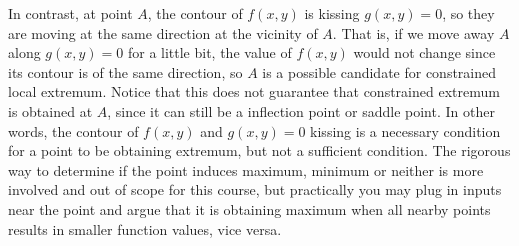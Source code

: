 In contrast, at point $A$, the contour of $f(x,y)$ is kissing $g(x,y) = 0$, so they are moving at the same direction at the vicinity of $A$.  That is, if we move away $A$ along $g(x,y)=0$ for a little bit, the value of $f(x,y)$ would not change since its contour is of the same direction, so $A$ is a possible candidate for constrained local extremum.  Notice that this does not guarantee that constrained extremum is obtained at $A$, since it can still be a inflection point or saddle point.  In other words, the contour of $f(x,y)$ and $g(x,y) = 0$ kissing is a necessary condition for a point to be obtaining extremum, but not a sufficient condition.  The rigorous way to determine if the point induces maximum, minimum or neither is more involved and out of scope for this course, but practically you may plug in inputs near the point and argue that it is obtaining maximum when all nearby points results in smaller function values, vice versa.

